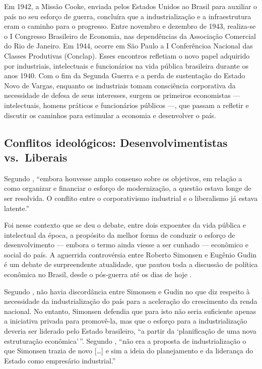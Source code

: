 \documentclass[
	10pt,				%
	openright,			%
	twoside,			%
	a5paper,			%
	english,			%
	french,				%
	spanish,			%
	brazil				%
	]{abntex2}
\renewenvironment{quote}
  {\small\list{}{\rightmargin=0.1cm \leftmargin=4cm}%
   \item\relax}
  {\endlist}
\begin{document}
\begin{quote}
Em 1942, a Missão Cooke, enviada pelos Estados Unidos ao Brasil para
auxiliar o país no seu esforço de guerra, concluíra que a
industrialização e a infraestrutura eram o caminho para o progresso.
Entre novembro e dezembro de 1943, realiza-se o I Congresso Brasileiro
de Economia, nas dependências da Associação Comercial do Rio de Janeiro.
Em 1944, ocorre em São Paulo a I Conferêncioa Nacional das Classes
Produtivas (Conclap). Esses encontros refletiam o novo papel adquirido
por industriais, intelectuais e funcionários na vida pública brasileira
durante os anos 1940. Com o fim da Segunda Guerra e a perda de
sustentação do Estado Novo de Vargas, enquanto os industriais tomam
consciência corporativa da necessidade de defesa de seus interesses,
surgem os primeiros economistas --- intelectuais, homens práticos e
funcionários públicos ---, que passam a refletir e discutir os caminhos
para estimular a economia e desenvolver o país.
\cite[p.~20]{resende2017}
\end{quote}

\subsection{Conflitos ideológicos: Desenvolvimentistas
vs.~Liberais}\label{conflitos-ideoluxf3gicos-desenvolvimentistas-vs.liberais}

Segundo , ``embora houvesse amplo
consenso sobre os objetivos, em relação a como organizar e financiar o
esforço de modernização, a questão estava longe de ser resolvida. O
conflito entre o corporativismo industrial e o liberalismo já estava
latente.''

\begin{quote}
Foi nesse contexto que se deu o debate, entre dois expoentes da vida
pública e intelectual da época, a propósito da melhor forma de conduzir
o esforço de desenvolvimento --- embora o termo ainda viesse a ser
cunhado --- econômico e social do país. A aguerrida controvérsia entre
Roberto Simonsen e Eugênio Gudin é um debate de surpreendente
atualidade, que pautou toda a discussão de política econômica no Brasil,
desde o pós-guerra até os dias de hoje \cite[p.~20]{resende2017}.
\end{quote}

Segundo , não havia discordância entre
Simonsen e Gudin no que diz respeito à necessidade da industrialização
do país para a aceleração do crescimento da renda nacional. No entanto,
Simonsen defendia que para isto não seria suficiente apenas a iniciativa
privada para promovê-la, mas que o esforço para a industrialização
deveria ser liderado pelo Estado brasileiro, ``a partir da `planificação
de uma nova estruturação econômica'\,''. Segundo
, ``não era a proposta de
industrialização o que Simonsen trazia de novo {[}\ldots{}{]} e sim a
ideia do planejamento e da liderança do Estado como empresário
industrial.''
\end{document}

